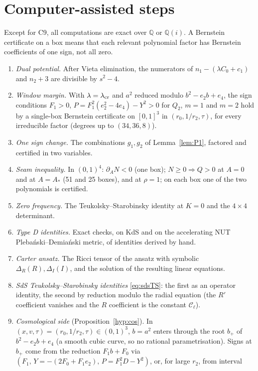 \documentclass[11pt]{amsart}
\theoremstyle{definition}
\theoremstyle{remark}
\numberwithin{equation}{section}
\begin{document}
\appendix
\section{Computer-assisted steps}\label{app:cert}\sloppy
Except for C9, all computations are exact over $\mathbb Q$ or $\mathbb Q(i)$. A Bernstein certificate on a box means
that each relevant polynomial factor has Bernstein coefficients of one sign, not all zero.
\begin{enumerate}[label=C\arabic*.,leftmargin=*]
\item \emph{Dual potential.} After Vieta elimination, the numerators of $n_1-(\lambda C_0+c_1)$ and $n_2+3$ are
divisible by $s^2-4$.
\item \emph{Window margin.} With $\lambda=\lambda_{\rm cr}$ and $a^2$ reduced modulo $b^2-e_2b+e_4$, the sign
conditions $F_1>0$, $P=F_1^2(e_2^2-4e_4)-Y^2>0$ for $Q_2$, $m=1$ and $m=2$ hold by a single-box Bernstein certificate
on $[0,1]^3$ in $(r_0,1/r_2,\tau)$, for every irreducible factor (degrees up to $(34,36,8)$).
\item \emph{One sign change.} The combinations $g_1,g_2$ of Lemma~\ref{lem:P1}, factored and certified in two
variables.
\item \emph{Seam inequality.} In $(0,1)^4$: $\partial_AN<0$ (one box); $N\ge0\Rightarrow Q>0$ at $A=0$ and at $A=A_*$
(51 and 25 boxes), and at $\rho=1$; on each box one of the two polynomials is certified.
\item \emph{Zero frequency.} The Teukolsky--Starobinsky identity at $K=0$ and the $4\times4$ determinant.
\item \emph{Type D identities.} Exact checks, on KdS and on the accelerating NUT Pleba\'nski--Demia\'nski metric, of
identities derived by hand.
\item \emph{Carter ansatz.} The Ricci tensor of the ansatz with symbolic $\Delta_R(R),\Delta_I(I)$, and the solution of
the resulting linear equations.
\item \emph{SdS Teukolsky--Starobinsky identities} \eqref{eq:sdsTS}: the first as an operator identity, the second by
reduction modulo the radial equation (the $R'$ coefficient vanishes and the $R$ coefficient is the constant
$\mathcal C_\ell$).
\item \emph{Cosmological side} (Proposition~\ref{hyp:cos}). In $(x,v,\tau)=(r_0,1/r_2,\tau)\in(0,1)^3$, $b=a^2$ enters
through the root $b_+$ of $b^2-e_2b+e_4$ (a smooth cubic curve, so no rational parametrisation). Signs at $b_+$ come
from the reduction $F_1b+F_0$ via $(F_1,\,Y=-(2F_0+F_1e_2),\,P=F_1^2D-Y^2)$, or, for large $r_2$, from interval

\end{enumerate}
\end{document}
